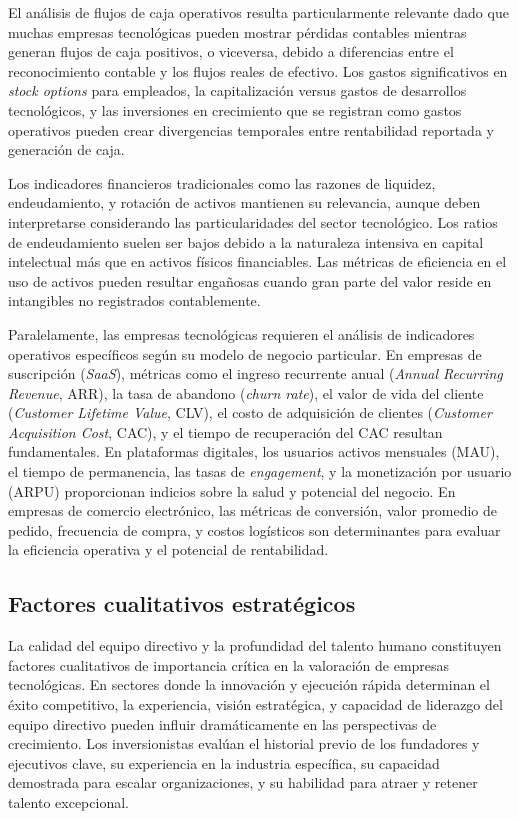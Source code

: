 El análisis de flujos de caja operativos resulta particularmente relevante dado que muchas empresas tecnológicas pueden mostrar pérdidas contables mientras generan flujos de caja positivos, o viceversa, debido a diferencias entre el reconocimiento contable y los flujos reales de efectivo. Los gastos significativos en \emph{stock options} para empleados, la capitalización versus gastos de desarrollos tecnológicos, y las inversiones en crecimiento que se registran como gastos operativos pueden crear divergencias temporales entre rentabilidad reportada y generación de caja.

Los indicadores financieros tradicionales como las razones de liquidez, endeudamiento, y rotación de activos mantienen su relevancia, aunque deben interpretarse considerando las particularidades del sector tecnológico. Los ratios de endeudamiento suelen ser bajos debido a la naturaleza intensiva en capital intelectual más que en activos físicos financiables. Las métricas de eficiencia en el uso de activos pueden resultar engañosas cuando gran parte del valor reside en intangibles no registrados contablemente.

Paralelamente, las empresas tecnológicas requieren el análisis de indicadores operativos específicos según su modelo de negocio particular. En empresas de suscripción (\emph{SaaS}), métricas como el ingreso recurrente anual (\emph{Annual Recurring Revenue}, ARR), la tasa de abandono (\emph{churn rate}), el valor de vida del cliente (\emph{Customer Lifetime Value}, CLV), el costo de adquisición de clientes (\emph{Customer Acquisition Cost}, CAC), y el tiempo de recuperación del CAC resultan fundamentales. En plataformas digitales, los usuarios activos mensuales (MAU), el tiempo de permanencia, las tasas de \emph{engagement}, y la monetización por usuario (ARPU) proporcionan indicios sobre la salud y potencial del negocio. En empresas de comercio electrónico, las métricas de conversión, valor promedio de pedido, frecuencia de compra, y costos logísticos son determinantes para evaluar la eficiencia operativa y el potencial de rentabilidad.

\subsection{Factores cualitativos estratégicos}

La calidad del equipo directivo y la profundidad del talento humano constituyen factores cualitativos de importancia crítica en la valoración de empresas tecnológicas. En sectores donde la innovación y ejecución rápida determinan el éxito competitivo, la experiencia, visión estratégica, y capacidad de liderazgo del equipo directivo pueden influir dramáticamente en las perspectivas de crecimiento. Los inversionistas evalúan el historial previo de los fundadores y ejecutivos clave, su experiencia en la industria específica, su capacidad demostrada para escalar organizaciones, y su habilidad para atraer y retener talento excepcional.


